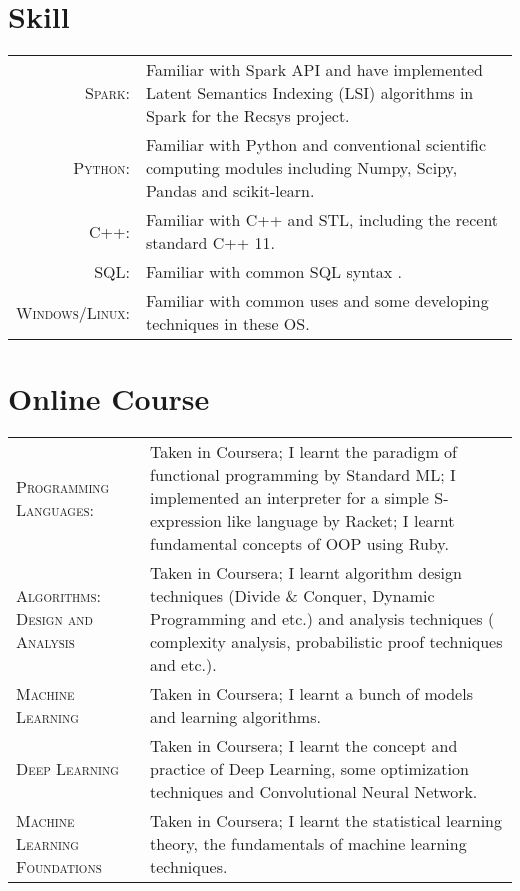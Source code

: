 \documentclass[a4paper,10pt]{article} %
\begin{document}
\section{Skill}

\begin{tabular}{rp{11cm}}
	\textsc{Spark:} & Familiar with Spark API and have implemented Latent Semantics Indexing (LSI) algorithms in Spark for the Recsys project.
	
	\\
	
	\textsc{Python:} &  Familiar with Python and conventional scientific computing modules including Numpy, Scipy, Pandas and scikit-learn.
	
	\\
	
	\textsc{C++:} & Familiar with C++ and STL, including the recent standard C++ 11.
	
	\\
	
	\textsc{SQL:} & Familiar with common SQL syntax .
	
	\\
	
	\textsc{Windows/Linux:} & Familiar with common uses and some developing techniques in these OS.
	
	\\
	
\end{tabular}

\section{Online Course}

\begin{tabular}{lp{8cm}}
	\textsc{Programming Languages:} & Taken in Coursera; I learnt the paradigm of functional programming by Standard ML; I implemented an interpreter for a simple S-expression like language by Racket; I learnt fundamental concepts of OOP using Ruby.
	
	\\
	
	\textsc{Algorithms: Design and Analysis} & Taken in Coursera; I learnt algorithm design techniques (Divide \& Conquer, Dynamic Programming and etc.) and analysis techniques ( complexity analysis, probabilistic proof techniques and etc.).
	
	\\
	
	\textsc{Machine Learning} & Taken in Coursera; I learnt a bunch of models and learning algorithms.
	
	\\ 
	
	\textsc{Deep Learning} & Taken in Coursera; I learnt the concept and practice of Deep Learning, some optimization techniques and Convolutional Neural Network.
	
	\\
	
	\textsc{Machine Learning Foundations} & Taken in Coursera; I learnt the statistical learning theory, the fundamentals of machine learning techniques.
	
	
\end{tabular}
\end{document}
